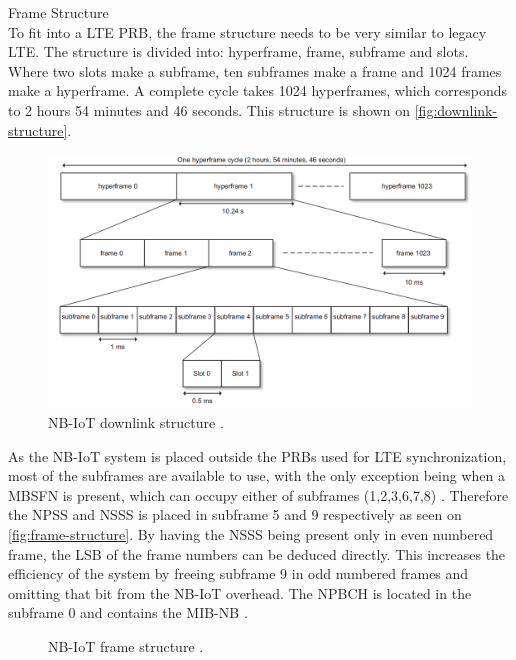 Frame Structure\\
To fit into a \gls{LTE} \gls{PRB}, the frame structure needs to be very similar to legacy \gls{LTE}. The structure is divided into: hyperframe, frame, subframe and slots. Where two slots make a subframe, ten subframes make a frame and 1024 frames make a hyperframe. A complete cycle takes 1024 hyperframes, which corresponds to 2 hours 54 minutes and 46 seconds. This structure is shown on \autoref{fig:downlink-structure}. \citep[ch. 7.2]{NB-IoT_Book}


\begin{figure}[H]
\centering
\includegraphics[width=\textwidth]{figures/downlink_structure_15kHz.png}
\caption{\gls{NB-IoT} downlink structure \citep[Fig. 7.7]{NB-IoT_Book}.}
\label{fig:downlink-structure}
\end{figure}


As the \gls{NB-IoT} system is placed outside the \gls{PRB}s used for LTE synchronization, most of the subframes are available to use, with the only exception being when a \gls{MBSFN} is present, which can occupy either of subframes (1,2,3,6,7,8) \citep{LTE-MBSFN}. Therefore the \gls{NPSS} and \gls{NSSS} is placed in subframe 5 and 9 respectively as seen on \autoref{fig:frame-structure}. By having the \gls{NSSS} being present only in even numbered frame, the \gls{LSB} of the frame numbers can be deduced directly. This increases the efficiency of the system by freeing subframe 9 in odd numbered frames and omitting that bit from the \gls{NB-IoT} overhead. The \gls{NPBCH} is located in the subframe 0 and contains the \gls{MIB-NB} \citep{REL-13}.  

\begin{figure}[H]
\centering

\caption{\gls{NB-IoT} frame structure \citep{REL-13}.}
\label{fig:frame-structure}
\end{figure}


